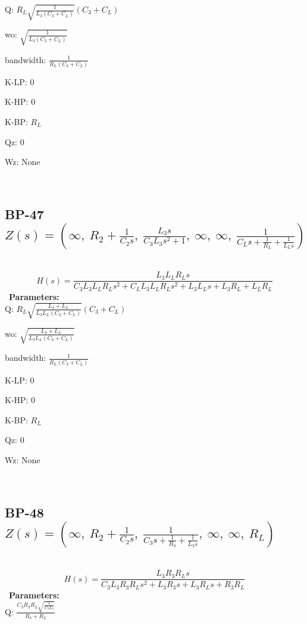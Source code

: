 \documentclass{article}
\begin{document}
Q: $R_{L} \sqrt{\frac{1}{L_{3} \left(C_{3} + C_{L}\right)}} \left(C_{3} + C_{L}\right)$\ 

wo: $\sqrt{\frac{1}{L_{3} \left(C_{3} + C_{L}\right)}}$\ 

bandwidth: $\frac{1}{R_{L} \left(C_{3} + C_{L}\right)}$\ 

K-LP: $0$\ 

K-HP: $0$\ 

K-BP: $R_{L}$\ 

Qz: $0$\ 

Wz: $\text{None}$\ 

\ 

\subsection{BP-47 $Z(s) = \left( \infty, \  R_{2} + \frac{1}{C_{2} s}, \  \frac{L_{3} s}{C_{3} L_{3} s^{2} + 1}, \  \infty, \  \infty, \  \frac{1}{C_{L} s + \frac{1}{R_{L}} + \frac{1}{L_{L} s}}\right)$ } \ 
\textbf{\[H(s) = \frac{L_{3} L_{L} R_{L} s}{C_{3} L_{3} L_{L} R_{L} s^{2} + C_{L} L_{3} L_{L} R_{L} s^{2} + L_{3} L_{L} s + L_{3} R_{L} + L_{L} R_{L}}\] } \ 
\textbf{Parameters:}\\ 

Q: $R_{L} \sqrt{\frac{L_{3} + L_{L}}{L_{3} L_{L} \left(C_{3} + C_{L}\right)}} \left(C_{3} + C_{L}\right)$\ 

wo: $\sqrt{\frac{L_{3} + L_{L}}{L_{3} L_{L} \left(C_{3} + C_{L}\right)}}$\ 

bandwidth: $\frac{1}{R_{L} \left(C_{3} + C_{L}\right)}$\ 

K-LP: $0$\ 

K-HP: $0$\ 

K-BP: $R_{L}$\ 

Qz: $0$\ 

Wz: $\text{None}$\ 

\ 

\subsection{BP-48 $Z(s) = \left( \infty, \  R_{2} + \frac{1}{C_{2} s}, \  \frac{1}{C_{3} s + \frac{1}{R_{3}} + \frac{1}{L_{3} s}}, \  \infty, \  \infty, \  R_{L}\right)$ } \ 
\textbf{\[H(s) = \frac{L_{3} R_{3} R_{L} s}{C_{3} L_{3} R_{3} R_{L} s^{2} + L_{3} R_{3} s + L_{3} R_{L} s + R_{3} R_{L}}\] } \ 
\textbf{Parameters:}\\ 

Q: $\frac{C_{3} R_{3} R_{L} \sqrt{\frac{1}{C_{3} L_{3}}}}{R_{3} + R_{L}}$\ 
\end{document}
